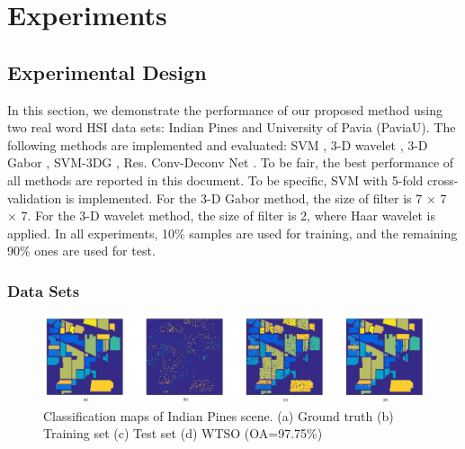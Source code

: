 \documentclass{ws-ijwmip}
\begin{document}
%



\section{Experiments}\label{sec:experiment}
\subsection{Experimental Design}



In this section, we demonstrate the performance of our proposed method using two real word HSI data sets: Indian Pines and University of Pavia (PaviaU). 
The following methods are implemented and evaluated:
SVM \cite{37}, 3-D wavelet \cite{29}, 3-D Gabor \cite{38}, SVM-3DG \cite{40}, Res. Conv-Deconv Net \cite{41}. 
To be fair, the best performance of all methods are reported in this document.
To be specific, SVM with 5-fold cross-validation is implemented.
For the 3-D Gabor method, the size of filter is 7 $\times$ 7 $\times$ 7.
For the 3-D wavelet method, the size of filter is 2, where Haar wavelet is applied. 
In all experiments, 10\% samples are used for training, and the remaining 90\% ones are used for test. 


\subsubsection{Data Sets}

\begin{figure}[htb]
	\centerline{\includegraphics[width=13cm]{image/indian_map}}
	\caption{Classification maps of Indian Pines scene. (a) Ground truth (b) Training set (c) Test set (d) WTSO (OA=97.75\%)}
	\label{figure7}
\end{figure}
\end{document}
